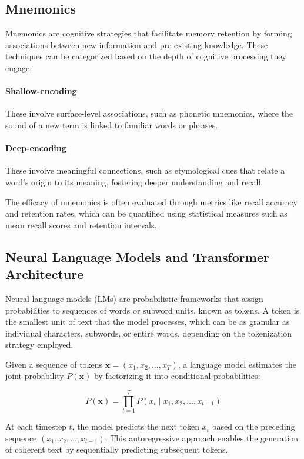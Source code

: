 \documentclass[11pt, onecolumn]{article}
\newcounter{para}
\begin{document}
\subsection{Mnemonics} \label{sec:pre-mnemonics}

Mnemonics are cognitive strategies that facilitate memory retention by forming associations between new information and pre-existing knowledge. These techniques can be categorized based on the depth of cognitive processing they engage:

\paragraph{Shallow-encoding} These involve surface-level associations, such as phonetic mnemonics, where the sound of a new term is linked to familiar words or phrases.
\paragraph{Deep-encoding} These involve meaningful connections, such as etymological cues that relate a word's origin to its meaning, fostering deeper understanding and recall.

The efficacy of mnemonics is often evaluated through metrics like recall accuracy and retention rates, which can be quantified using statistical measures such as mean recall scores and retention intervals.

\subsection{Neural Language Models and Transformer Architecture} \label{sec:pre-lm}

Neural language models (LMs) are probabilistic frameworks that assign probabilities to sequences of words or subword units, known as tokens. A token is the smallest unit of text that the model processes, which can be as granular as individual characters, subwords, or entire words, depending on the tokenization strategy employed.

Given a sequence of tokens \( \mathbf{x} = (x_1, x_2, \ldots, x_T) \), a language model estimates the joint probability \( P(\mathbf{x}) \) by factorizing it into conditional probabilities:

\[
P(\mathbf{x}) = \prod_{t=1}^T P(x_t \mid x_1, x_2, \ldots, x_{t-1})
\]

At each timestep \( t \), the model predicts the next token \( x_t \) based on the preceding sequence \( (x_1, x_2, \ldots, x_{t-1}) \). This autoregressive approach enables the generation of coherent text by sequentially predicting subsequent tokens.
\end{document}
